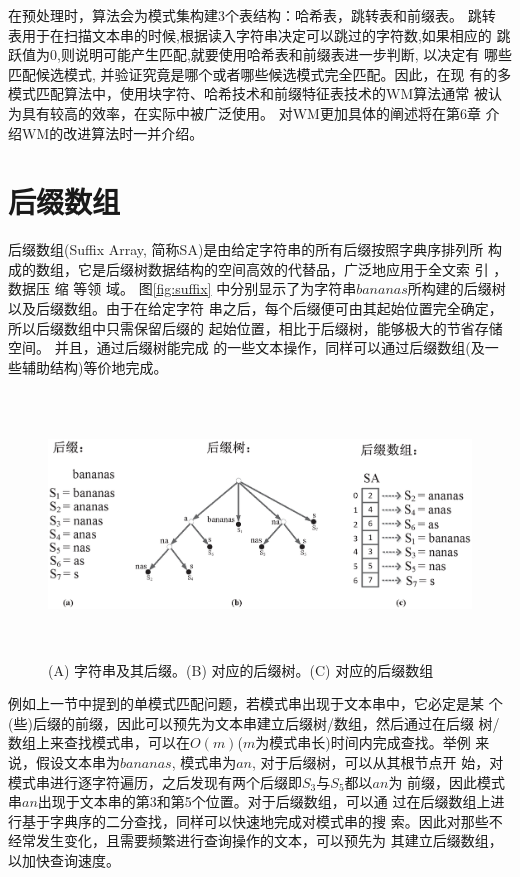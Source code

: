 在预处理时，算法会为模式集构建3个表结构：哈希表，跳转表和前缀表。 跳转
表用于在扫描文本串的时候,根据读入字符串决定可以跳过的字符数,如果相应的
跳跃值为0,则说明可能产生匹配,就要使用哈希表和前缀表进一步判断, 以决定有
哪些匹配候选模式, 并验证究竟是哪个或者哪些候选模式完全匹配。因此，在现
有的多模式匹配算法中，使用块字符、哈希技术和前缀特征表技术的WM算法通常
被认为具有较高的效率，在实际中被广泛使用。 对WM更加具体的阐述将在第6章
介绍WM的改进算法时一并介绍。

\section{后缀数组}

后缀数组(Suffix Array, 简称SA)是由给定字符串的所有后缀按照字典序排列所
构成的数组，它是后缀树数据结构的空间高效的代替品，广泛地应用于全文索
引 \cite{Strate2015,Fischer2017,Arroyuelo2014}，数据压
缩\cite{Louza2015,Chien2015,Pradhan2016,Brisaboa2015} 等领
域。 图\ref{fig:suffix}
中分别显示了为字符串$bananas$所构建的后缀树以及后缀数组。由于在给定字符
串之后，每个后缀便可由其起始位置完全确定，所以后缀数组中只需保留后缀的
起始位置，相比于后缀树，能够极大的节省存储空间。 并且，通过后缀树能完成
的一些文本操作，同样可以通过后缀数组(及一些辅助结构)等价地完成。

\begin{figure}[!h]
  \centering
  \includegraphics[height=7cm ,width=15cm]{figures/1_Introduction/Suffix.eps}
  \caption{(A) 字符串及其后缀。(B) 对应的后缀树。(C) 对应的后缀数组}
  \label{fig:Suffix}
\end{figure}

例如上一节中提到的单模式匹配问题，若模式串出现于文本串中，它必定是某
个(些)后缀的前缀，因此可以预先为文本串建立后缀树/数组，然后通过在后缀
树/数组上来查找模式串，可以在$O(m)$($m$为模式串长)时间内完成查找。举例
来说，假设文本串为$bananas$, 模式串为$an$, 对于后缀树，可以从其根节点开
始，对模式串进行逐字符遍历，之后发现有两个后缀即$S_3$与$S_5$都以$an$为
前缀，因此模式串$an$出现于文本串的第3和第5个位置。对于后缀数组，可以通
过在后缀数组上进行基于字典序的二分查找，同样可以快速地完成对模式串的搜
索。因此对那些不经常发生变化，且需要频繁进行查询操作的文本，可以预先为
其建立后缀数组，以加快查询速度。

